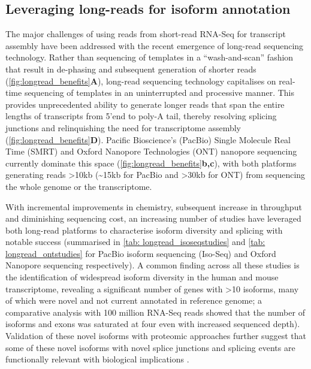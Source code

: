 \subsection{Leveraging long-reads for isoform annotation}
The major challenges of using reads from short-read RNA-Seq for transcript assembly have been addressed with the recent emergence of long-read sequencing technology. Rather than sequencing of templates in a “wash-and-scan” fashion that result in de-phasing and subsequent generation of shorter reads (\cref{fig:longread_benefits}\textbf{A}), long-read sequencing technology capitalises on real-time sequencing of templates in an uninterrupted and processive manner. This provides unprecedented ability to generate longer reads that span the entire lengths of transcripts from 5'end to poly-A tail, thereby resolving splicing junctions and relinquishing the need for transcriptome assembly (\cref{fig:longread_benefits}\textbf{D}). Pacific Bioscience's (PacBio) Single Molecule Real Time (SMRT) and Oxford Nanopore Technologies (ONT) nanopore sequencing currently dominate this space (\cref{fig:longread_benefits}\textbf{b,c}), with both platforms generating reads >10kb (\textasciitilde15kb for PacBio and >30kb for ONT) from sequencing the whole genome or the transcriptome.  

With incremental improvements in chemistry, subsequent increase in throughput and diminishing sequencing cost, an increasing number of studies have leveraged both long-read platforms to characterise isoform diversity and splicing with notable success (summarised in \cref{tab: longread_isoseqstudies} and \cref{tab: longread_ontstudies} for PacBio isoform sequencing (Iso-Seq) and Oxford Nanopore sequencing respectively). A common finding across all these studies is the identification of widespread isoform diversity in the human \cite{Sharon2013, Au2013,Tseng2019,DeslattesMays2019} and mouse transcriptome, revealing a significant number of genes with >10 isoforms, many of which were novel and not current annotated in reference genome; a comparative analysis with 100 million RNA-Seq reads showed that the number of isoforms and exons was saturated at four even with increased sequenced depth\cite{DeslattesMays2019}). Validation of these novel isoforms with proteomic approaches further suggest that some of these novel isoforms with novel splice junctions and splicing events are functionally relevant with biological implications \cite{Huang2021}. 

